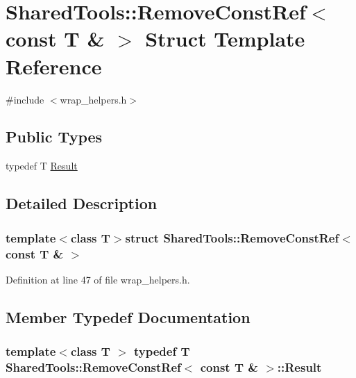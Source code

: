 \hypertarget{struct_shared_tools_1_1_remove_const_ref_3_01const_01_t_01_6_01_4}{\section{Shared\-Tools\-:\-:Remove\-Const\-Ref$<$ const T \& $>$ Struct Template Reference}
\label{struct_shared_tools_1_1_remove_const_ref_3_01const_01_t_01_6_01_4}
}


{\ttfamily \#include $<$wrap\-\_\-helpers.\-h$>$}

\subsection*{Public Types}
\begin{DoxyCompactItemize}
\item 
typedef T \hyperlink{struct_shared_tools_1_1_remove_const_ref_3_01const_01_t_01_6_01_4_ac2cedb2a6f4bd27d3c950128a5560910}{Result}
\end{DoxyCompactItemize}


\subsection{Detailed Description}
\subsubsection*{template$<$class T$>$struct Shared\-Tools\-::\-Remove\-Const\-Ref$<$ const T \& $>$}



Definition at line 47 of file wrap\-\_\-helpers.\-h.



\subsection{Member Typedef Documentation}
\hypertarget{struct_shared_tools_1_1_remove_const_ref_3_01const_01_t_01_6_01_4_ac2cedb2a6f4bd27d3c950128a5560910}{
\subsubsection[{Result}]{\setlength{\rightskip}{0pt plus 5cm}template$<$class T $>$ typedef T {\bf Shared\-Tools\-::\-Remove\-Const\-Ref}$<$ const T \& $>$\-::{\bf Result}}}\label{struct_shared_tools_1_1_remove_const_ref_3_01const_01_t_01_6_01_4_ac2cedb2a6f4bd27d3c950128a5560910}


